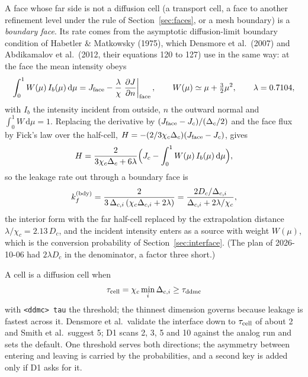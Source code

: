 \documentclass[11pt]{article}
\newcommand{\key}[1]{\texttt{#1}}
\newcommand{\dd}{\mathrm{d}}
\begin{document}
A face whose far side is not a diffusion cell (a transport cell, a face to another
refinement level under the rule of Section~\ref{sec:faces}, or a mesh boundary) is a
\emph{boundary face}.  Its rate comes from the asymptotic diffusion-limit boundary
condition of Habetler \& Matkowsky (1975), which Densmore et al.\ (2007) and
Abdikamalov et al.\ (2012, their equations 120 to 127) use in the same way: at the face
the mean intensity obeys
\begin{equation}
  \int_0^1 W(\mu)\,I_b(\mu)\,\dd\mu = J_{\rm face} - \frac{\lambda}{\chi}
  \left.\frac{\partial J}{\partial n}\right|_{\rm face},\qquad
  W(\mu)\simeq \mu + \tfrac32\mu^2,\qquad \lambda = 0.7104,
  \label{eq:abc}
\end{equation}
with $I_b$ the intensity incident from outside, $n$ the outward normal and
$\int_0^1 W\,\dd\mu = 1$.  Replacing the derivative by $(J_{\rm face} - J_c)/(\Delta_c/2)$
and the face flux by Fick's law over the half-cell, $H = -(2/3\chi_c\Delta_c)(J_{\rm face}
- J_c)$, gives
\begin{equation}
  H = \frac{2}{3\chi_c\Delta_c + 6\lambda}\Bigl(J_c - \int_0^1 W(\mu)\,I_b(\mu)\,\dd\mu\Bigr),
\end{equation}
so the leakage rate out through a boundary face is
\begin{equation}
  k_f^{\rm (bdy)} = \frac{2}{3\,\Delta_{c,i}\,(\chi_c\Delta_{c,i} + 2\lambda)}
  = \frac{2D_c/\Delta_{c,i}}{\Delta_{c,i} + 2\lambda/\chi_c} ,
  \label{eq:kbdy}
\end{equation}
the interior form with the far half-cell replaced by the extrapolation distance
$\lambda/\chi_c = 2.13\,D_c$, and the incident intensity enters as a source with
weight $W(\mu)$, which is the conversion probability of Section~\ref{sec:interface}.
(The plan of 2026-10-06 had $2\lambda D_c$ in the denominator, a factor three short.)

A cell is a diffusion cell when
\begin{equation}
  \tau_{\rm cell} = \chi_c \min_i \Delta_{c,i} \ge \tau_{\rm ddmc}
\end{equation}
with \key{<ddmc> tau} the threshold; the thinnest dimension governs because leakage
is fastest across it.  Densmore et al.\ validate the interface down to $\tau_{\rm cell}$
of about 2 and Smith et al.\ suggest 5; D1 scans 2, 3, 5 and 10 against the analog run
and sets the default.  One threshold serves both directions; the asymmetry between
entering and leaving is carried by the probabilities, and a second key is added only if
D1 asks for it.
\end{document}
